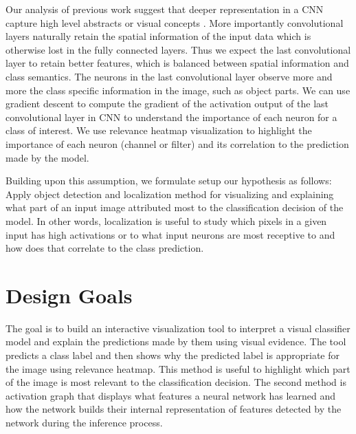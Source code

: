 Our analysis of previous work suggest that deeper representation in a CNN capture high level abstracts or visual concepts \cite{Zeiler}. More importantly convolutional layers naturally retain the spatial information of the input data which is otherwise lost in the fully connected layers. Thus we expect the last convolutional layer to retain better features, which is balanced between spatial information and class semantics. The neurons in the last convolutional layer observe more and more the class specific information in the image, such as object parts. We can use gradient descent to compute the gradient of the activation output of the last convolutional layer in CNN to understand the importance of each neuron for a class of interest. We use relevance heatmap visualization to highlight the importance of each neuron (channel or filter) and its correlation to the prediction made by the model.

Building upon this assumption, we formulate setup our hypothesis as follows: Apply object detection and localization method for visualizing and explaining what part of an input image attributed most to the classification decision of the model. In other words, localization is useful to study which pixels in a given input has high activations or to what input neurons are most receptive to and how does that correlate to the class prediction.


\section{Design Goals}

The goal is to build an interactive visualization tool to interpret a visual classifier model and explain the predictions made by them using visual evidence.  The tool predicts a class label and then shows why the predicted label is appropriate for the image using relevance heatmap. This method is useful to highlight which part of the image is most relevant to the classification decision. The second method is activation graph that displays what features a neural network has learned and how the network builds their internal representation of  features detected by the network during the inference process. 

